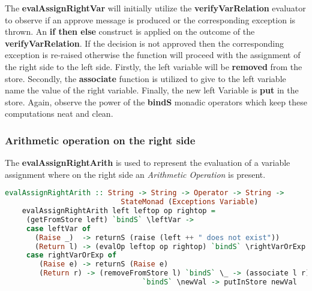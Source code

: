 \documentclass[a4paper, onecolumn]{article}
\begin{document}
    \noindent The \textbf{evalAssignRightVar} will initially utilize the \textbf{verifyVarRelation} evaluator to observe if an approve message is produced or the corresponding exception is thrown. An \textbf{if then else} construct is applied on the outcome of the \textbf{verifyVarRelation}. If the decision is not approved then the corresponding exception is re-raised otherwise the function will proceed with the assignment of the right side to the left side. Firstly, the left variable will be \textbf{removed} from the store. Secondly, the \textbf{associate} function is utilized to give to the left variable name the value of the right variable. Finally, the new left Variable is \textbf{put} in the store. Again, observe the power of the \textbf{bindS} monadic operators which keep these computations neat and clean.   
    
    \subsubsection{Arithmetic operation on the right side}
    
    The \textbf{evalAssignRightArith} is used to represent the evaluation of a variable assignment where on the right side an \textit{Arithmetic Operation} is present.
    
    \begin{tcolorbox}
    \begin{lstlisting}[language=Haskell] 
    evalAssignRightArith :: String -> String -> Operator -> String ->
                           StateMonad (Exceptions Variable)
    evalAssignRightArith left leftop op rightop = 
     (getFromStore left) `bindS` \leftVar -> 
     case leftVar of 
       (Raise _)  -> returnS (raise (left ++ " does not exist"))
       (Return l) -> (evalOp leftop op rightop) `bindS` \rightVarOrExp -> 
     case rightVarOrExp of 
        (Raise e) -> returnS (Raise e)
        (Return r) -> (removeFromStore l) `bindS` \_ -> (associate l r) 
                                `bindS` \newVal -> putInStore newVal
    \end{lstlisting}
    \end{tcolorbox}
    
\end{document}
